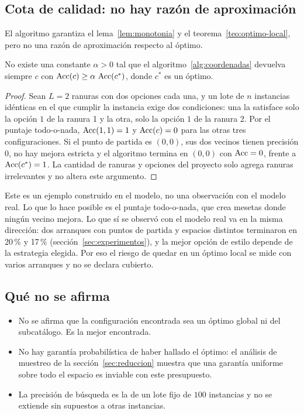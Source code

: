\subsection{Cota de calidad: no hay razón de aproximación}

El algoritmo garantiza el lema~\ref{lem:monotonia} y el teorema~\ref{teo:optimo-local},
pero no una razón de aproximación respecto al óptimo.

\begin{teorema}\label{teo:contraejemplo}
No existe una constante $\alpha>0$ tal que el algoritmo~\ref{alg:coordenadas} devuelva
siempre $c$ con $\operatorname{Acc}(c)\ge\alpha\,\operatorname{Acc}(c^*)$, donde $c^*$ es un óptimo.
\end{teorema}
\begin{proof}
Sean $L=2$ ranuras con dos opciones cada una, y un lote de $n$ instancias idénticas en el
que cumplir la instancia exige dos condiciones: una la satisface solo la opción $1$ de la
ranura 1 y la otra, solo la opción $1$ de la ranura 2. Por el puntaje todo-o-nada,
$\operatorname{Acc}(1,1)=1$ y $\operatorname{Acc}(c)=0$ para las otras tres configuraciones. Si el punto de partida es
$(0,0)$, sus dos vecinos tienen precisión $0$, no hay mejora estricta y el algoritmo termina
en $(0,0)$ con $\operatorname{Acc}=0$, frente a $\operatorname{Acc}(c^*)=1$. La cantidad de ranuras y opciones del
proyecto solo agrega ranuras irrelevantes y no altera este argumento.
\end{proof}

Este es un ejemplo construido en el modelo, no una observación con el modelo real. Lo que
lo hace posible es el puntaje todo-o-nada, que crea mesetas donde ningún vecino mejora. Lo
que sí se observó con el modelo real va en la misma dirección: dos arranques con puntos de
partida y espacios distintos terminaron en 20\,\% y 17\,\% (sección~\ref{sec:experimentos}),
y la mejor opción de estilo depende de la estrategia elegida. Por eso el riesgo de quedar
en un óptimo local se mide con varios arranques y no se declara cubierto.

\subsection{Qué no se afirma}

\begin{itemize}
  \item No se afirma que la configuración encontrada sea un óptimo global ni del
  subcatálogo. Es la mejor encontrada.
  \item No hay garantía probabilística de haber hallado el óptimo: el análisis de muestreo
  de la sección~\ref{sec:reduccion} muestra que una garantía uniforme sobre todo el espacio
  es inviable con este presupuesto.
  \item La precisión de búsqueda es la de un lote fijo de $100$ instancias y no se extiende
  sin supuestos a otras instancias.
\end{itemize}
